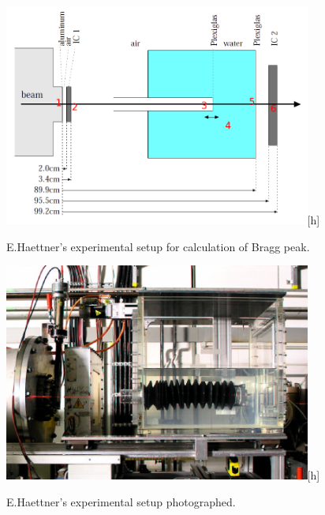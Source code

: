 \begin{figure}[!h] 
\begin{center}
\includegraphics[width=0.9\textwidth]{images/haetnnersetup2.png}[h]  
\caption{\label{fig:haettnersetup} E.Haettner's experimental setup for calculation of Bragg peak.}
 \end{center}
 \end{figure}
\begin{figure}[ht] 
\begin{center}
\includegraphics[width=0.9\textwidth]{images/haettnersetup.png}[h]  
\caption{\label{fig:haettnersetup2} E.Haettner's experimental setup photographed.}
 \end{center}
 \end{figure}

